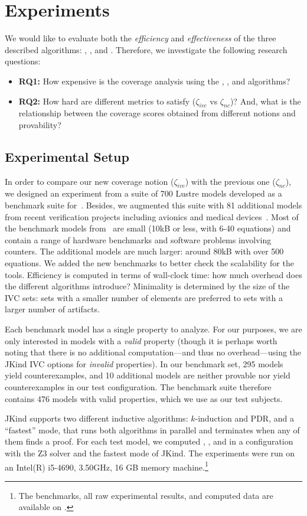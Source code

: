 \section{Experiments}
\label{sec:experiments}

We would like to evaluate both the {\em efficiency} and {\em
  effectiveness} of the three described algorithms: \ucbfalg, \ucalg, and \mustalg. Therefore, we investigate the following research questions:
\begin{itemize}
    \item \textbf{RQ1:} How expensive is the coverage analysis using the \ucalg, \mustalg, and \ucbfalg algorithms?
    \item \textbf{RQ2:} How hard are different metrics to satisfy ($\zeta_{ivc}$ vs $\zeta_{nc}$)?  And, what is the relationship between the coverage scores obtained from different notions and provability?
\end{itemize}

\subsection{Experimental Setup}

In order to compare our new coverage notion ($\zeta_{ivc}$) with the previous one ($\zeta_{nc}$), we designed an experiment from a suite of 700 Lustre models developed
as a benchmark suite for~\cite{Hagen08:FMCAD}. Besides, we augmented this suite
with 81 additional models from recent verification projects including
avionics and medical devices~\cite{QFCS15:backes,hilt2013}. Most of
the benchmark models from~\cite{Hagen08:FMCAD} are small (10kB or less,
with 6-40 equations) and contain a range of hardware benchmarks and
software problems involving counters. The additional models are much
larger: around 80kB with over 500 equations. We added the new
benchmarks to better check the scalability for the tools. Efficiency is computed in terms of wall-clock time: how
much overhead does the different algorithms introduce? Minimality is
determined by the size of the IVC sets: sets with a smaller number of
elements are preferred to sets with a larger number of artifacts.

Each benchmark model has a single property to analyze.  For our purposes, we are only interested in models with a {\em valid} property (though it is perhaps worth noting that there is no additional computation---and thus no overhead---using the JKind IVC options for {\em invalid} properties).  In our benchmark set, 295 models yield counterexamples, and 10 additional models are neither provable nor yield counterexamples in our test configuration.  The benchmark suite therefore contains 476 models with valid properties, which we use as our test subjects.

JKind supports two different inductive algorithms: $k$-induction and PDR, and a ``fastest'' mode, that runs both algorithms in parallel and terminates when any of them finds a proof. For each test model, we computed \ucalg, \ucbfalg, and \mustalg in a configuration with
the Z3 solver and the fastest mode of JKind. The experiments
were run on an  Intel(R) i5-4690, 3.50GHz,
16 GB memory machine.\footnote{The benchmarks, all raw experimental results,
  and computed data are available on \cite{expr}.}

